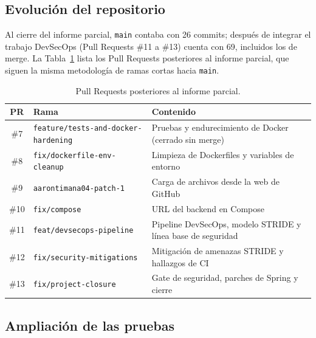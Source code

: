 \documentclass[12pt,a4paper]{article}
\begin{document}
\subsection{Evolución del repositorio}

Al cierre del informe parcial, \texttt{main} contaba con 26 commits; después de integrar el trabajo
DevSecOps (Pull Requests \#11 a \#13) cuenta con 69, incluidos los de merge. La
Tabla~\ref{tab:prs-final} lista los Pull Requests posteriores al informe parcial, que siguen la misma
metodología de ramas cortas hacia \texttt{main}.

\begin{table}[htbp]
  \centering
  \caption{Pull Requests posteriores al informe parcial.}
  \label{tab:prs-final}
  \begin{tabularx}{\textwidth}{clX}
    \toprule
    \textbf{PR} & \textbf{Rama} & \textbf{Contenido} \\
    \midrule
    \#7 & \texttt{feature/tests-and-docker-hardening} & Pruebas y endurecimiento de Docker
                                                       (cerrado sin merge) \\
    \#8 & \texttt{fix/dockerfile-env-cleanup}       & Limpieza de Dockerfiles y variables de
                                                       entorno \\
    \#9 & \texttt{aarontimana04-patch-1}            & Carga de archivos desde la web de GitHub \\
    \#10 & \texttt{fix/compose}                    & URL del backend en Compose \\
    \#11 & \texttt{feat/devsecops-pipeline}        & Pipeline DevSecOps, modelo STRIDE y línea
                                                       base de seguridad \\
    \#12 & \texttt{fix/security-mitigations}       & Mitigación de amenazas STRIDE y hallazgos
                                                       de CI \\
    \#13 & \texttt{fix/project-closure}            & Gate de seguridad, parches de Spring y
                                                       cierre \\
    \bottomrule
  \end{tabularx}
\end{table}

\subsection{Ampliación de las pruebas}
\end{document}
